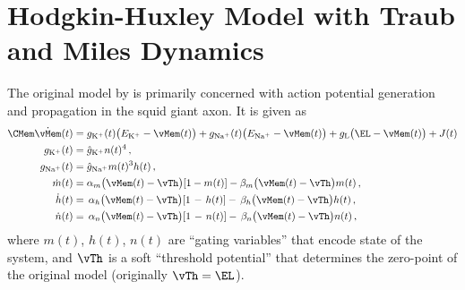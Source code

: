 \section{Hodgkin-Huxley Model with Traub and Miles Dynamics}
\label{app:hippocampal_hh}

The original model by \citet{hodgkin1952quantitative} is primarily concerned with action potential generation and propagation in the squid giant axon. It is given as
\begin{align*}
	\CMem \dot\vMem(t)
	&=    g_\mathrm{K^+}(t) \bigl(E_\mathrm{K^+} - \vMem(t)\bigr)
		+ g_\mathrm{Na^+}(t) \bigl(E_\mathrm{Na^+} - \vMem(t)\bigr)
		+ g_\mathrm{L} \bigl(\EL - \vMem(t)\bigr) + J(t) \\
	g_\mathrm{K^+}(t) &= \hat g_\mathrm{K^+} n(t)^4 \,, \\
	g_\mathrm{Na^+}(t) &= \hat g_\mathrm{Na^+} m(t)^3 h(t) \,, \\
	\dot m(t) &= \alpha_m\bigl(\vMem(t) - \vTh\bigr) [1 - m(t)]  - \beta_m\bigl(\vMem(t) - \vTh\bigr) m(t)  \,,\\
	\dot h(t) &= \,\alpha_h\bigl(\vMem(t) - \vTh\bigr) [1 \hspace{0.125em} - \hspace{0.125em} h(t)] - \, \beta_h\bigl(\vMem(t) - \vTh\bigr) h(t) \,,\\
	\dot n(t) &= \,\alpha_n\bigl(\vMem(t) - \vTh\bigr) [1 \hspace{0.125em} - \hspace{0.125em} n(t)] - \, \beta_n\bigl(\vMem(t) - \vTh\bigr) n(t) \,,
\end{align*}
where $m(t)$, $h(t)$, $n(t)$ are \enquote{gating variables} that encode state of the system, and $\vTh$ is a soft \enquote{threshold potential} that determines the zero-point of the original model (originally $\vTh = \EL$).

